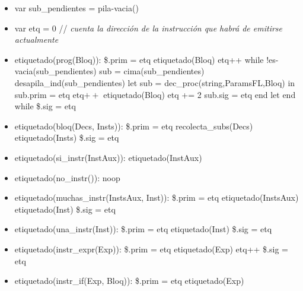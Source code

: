 \documentclass[11pt]{article}
\begin{document}
    \begin{itemize}
        \item var sub\_pendientes = pila-vacia()
        \item var etq = 0 \/// \textit{cuenta la
        dirección de la instrucción que habrá de emitirse actualmente}
        \item etiquetado(prog(Bloq)): 
            \subitem \$.prim = etq
            \subitem etiquetado(Bloq)
            \subitem etq++
            \subitem while !es-vacia(sub\_pendientes)
                \subsubitem sub = cima(sub\_pendientes)
                \subsubitem desapila\_ind(sub\_pendientes)
                \subsubitem let sub = dec\_proc(string,ParamsFL,Bloq) in
                    \subsubitem \hspace{2em} sub.prim = etq
                    \subsubitem \hspace{2em} etq$++$
                    \subsubitem \hspace{2em} etiquetado(Bloq)
                    \subsubitem \hspace{2em} etq += 2
                    \subsubitem \hspace{2em} sub.sig = etq
                \subsubitem end let
            \subitem end while
            \subitem \$.sig = etq
        \item etiquetado(bloq(Decs, Insts)): 
            \subitem \$.prim = etq
            \subitem recolecta\_subs(Decs)
            \subitem etiquetado(Insts)
            \subitem \$.sig = etq
        \item etiquetado(si\_instr(InstAux)): 
            \subitem etiquetado(InstAux)
        \item etiquetado(no\_instr()): 
            \subitem noop
        \item etiquetado(muchas\_instr(InstsAux, Inst)): 
            \subitem \$.prim = etq
            \subitem etiquetado(InstsAux)
            \subitem etiquetado(Inst)
            \subitem \$.sig = etq
        \item etiquetado(una\_instr(Inst)): 
            \subitem \$.prim = etq
            \subitem etiquetado(Inst)
            \subitem \$.sig = etq
        \item etiquetado(instr\_expr(Exp)): 
            \subitem \$.prim = etq
            \subitem etiquetado(Exp)
            \subitem etq++
            \subitem \$.sig = etq
        \item etiquetado(instr\_if(Exp, Bloq)): 
            \subitem \$.prim = etq
            \subitem etiquetado(Exp)

\end{itemize}
\end{document}
